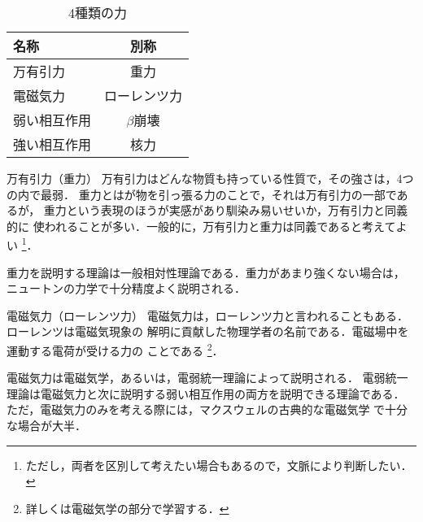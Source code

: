                  \begin{table}[htb]
                  \centering
                  \caption{4種類の力}
                  \begin{tabular}{|l|c|}           \hline
                    名称         & 別称         \\ \hline  \hline
                    万有引力     & 重力         \\ \hline
                    電磁気力     & ローレンツ力 \\ \hline
                    弱い相互作用 & $\beta$崩壊  \\ \hline
                    強い相互作用 & 核力         \\ \hline
                  \end{tabular}
                  \label{table:f4force}
                \end{table}

            \begin{mysmallsec}{万有引力（重力）}
            万有引力はどんな物質も持っている性質で，その強さは，4つの内で最弱．
            重力とはが物を引っ張る力のことで，それは万有引力の一部であるが，
            重力という表現のほうが実感があり馴染み易いせいか，万有引力と同義的に
            使われることが多い．一般的に，万有引力と重力は同義であると考えてよい
                \footnote{
                    ただし，両者を区別して考えたい場合もあるので，文脈により判断したい．
                }．

            重力を説明する理論は一般相対性理論である．重力があまり強くない場合は，
            ニュートンの力学で十分精度よく説明される．
            \end{mysmallsec}

            \begin{mysmallsec}{電磁気力（ローレンツ力）}
            電磁気力は，ローレンツ力と言われることもある．ローレンツは電磁気現象の
            解明に貢献した物理学者の名前である．電磁場中を運動する電荷が受ける力の
            ことである
                \footnote{
                    詳しくは電磁気学の部分で学習する．
                }．

                        電磁気力は電磁気学，あるいは，電弱統一理論によって説明される．
                        電弱統一理論は電磁気力と次に説明する弱い相互作用の両方を説明できる理論である．
                        ただ，電磁気力のみを考える際には，マクスウェルの古典的な電磁気学
                        で十分な場合が大半．
            \end{mysmallsec}

